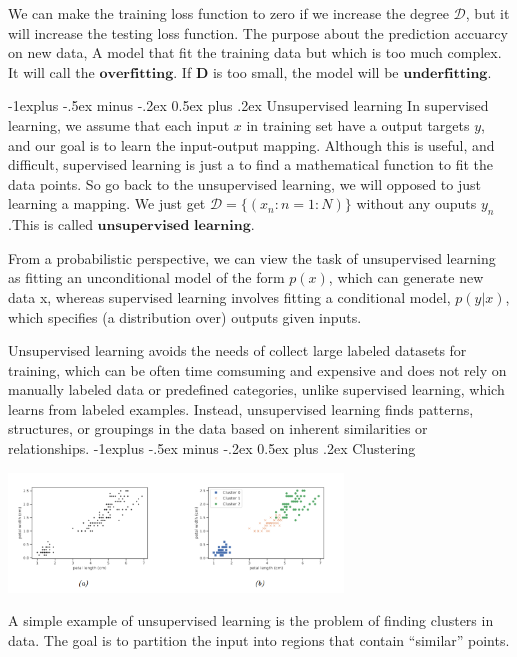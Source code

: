 \documentclass[10pt,landscape]{article}
\makeatletter
\renewcommand{\subsection}{\@startsection{subsection}{2}{0mm}%
                                {-1explus -.5ex minus -.2ex}%
                                {0.5ex plus .2ex}%
                                {\normalfont\normalsize\bfseries}}
\makeatother
\begin{document}
\begin{multicols*}{3}
    We can make the training loss function to zero if we increase the degree $\mathcal{D}$, but it will increase the testing loss function. The purpose about the prediction accuarcy on new data, A model that fit the training data but which is too much complex. It will call the $\textbf{overfitting}$. If $\mathbf{D}$ is too small, the model will be $\textbf{underfitting}$.
    
\subsection{Unsupervised learning}
    In supervised learning, we assume that each input $x$ in training set have a output targets $y$, and our goal is to learn the input-output mapping. Although this is useful, and difficult, supervised learning is just a to find a mathematical function to fit the data points. So go back to the unsupervised learning, we will opposed to just learning a mapping. We just get $\mathcal{D} = \{(x_n : n = 1 : N)\}$ without any ouputs $y_n$.This is called $\textbf{unsupervised learning}$.

    From a probabilistic perspective, we can view the task of unsupervised learning as fitting an unconditional model of the form $p(x)$, which can generate new data x, whereas supervised learning involves fitting a conditional model, $p(y|x)$, which specifies (a distribution over) outputs given inputs.

    Unsupervised learning avoids the needs of collect large labeled datasets for training, which can be often time comsuming and expensive and does not rely on manually labeled data or predefined categories, unlike supervised learning, which learns from labeled examples. Instead, unsupervised learning finds patterns, structures, or groupings in the data based on inherent similarities or relationships.
\subsection{Clustering}
    \begin{minipage}{\linewidth}
            \centering
            \includegraphics[width=3.5in]{figures/clustering.PNG}
    \end{minipage}
    A simple example of unsupervised learning is the problem of finding clusters in data. The goal is to partition the input into regions that contain “similar” points.

\end{multicols*}
\end{document}

